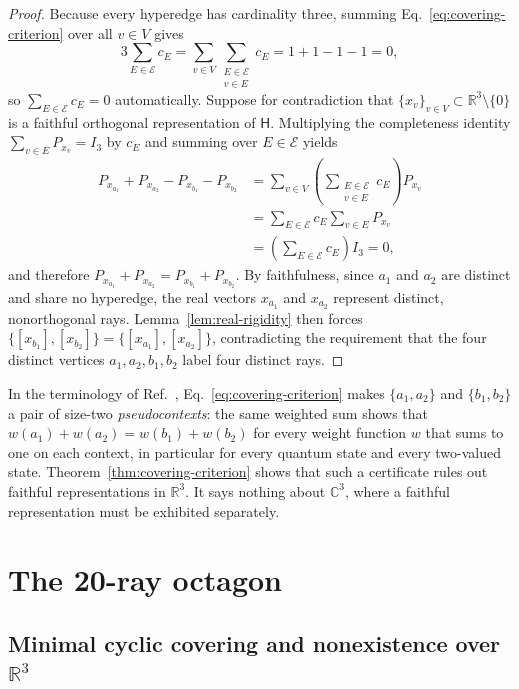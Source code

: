\documentclass[twocolumn,aps,pra,floatfix,amsmath,amssymb,longbibliography]{revtex4-2}
\newenvironment{handrewrite}{\leavevmode\color{blue}}{}
\theoremstyle{definition}
\theoremstyle{remark}
\newcommand{\C}{\mathbb C}
\newcommand{\R}{\mathbb R}
\begin{document}
\begin{proof}
Because every hyperedge has cardinality three, summing
Eq.~\eqref{eq:covering-criterion} over all $v\in V$ gives
\[
 3\sum_{E\in\mathcal E} c_E
 =\sum_{v\in V}\sum_{\substack{E\in\mathcal E\\ v\in E}} c_E
 =1+1-1-1=0,
\]
so $\sum_{E\in\mathcal E} c_E=0$ automatically.  Suppose for contradiction
that $\{x_v\}_{v\in V}\subset\R^3\setminus\{0\}$ is a faithful orthogonal
representation of $\mathsf H$.  Multiplying the completeness identity
$\sum_{v\in E} P_{x_v}=I_3$ by $c_E$ and summing over $E\in\mathcal E$ yields
\begin{align*}
 P_{x_{a_1}}+P_{x_{a_2}}-P_{x_{b_1}}-P_{x_{b_2}}
 &=\sum_{v\in V}\!\left(\sum_{\substack{E\in\mathcal E\\ v\in E}} c_E\right)P_{x_v}\\
 &=\sum_{E\in\mathcal E} c_E\sum_{v\in E} P_{x_v}\\
 &=\left(\sum_{E\in\mathcal E} c_E\right)I_3=0,
\end{align*}
and therefore $P_{x_{a_1}}+P_{x_{a_2}}=P_{x_{b_1}}+P_{x_{b_2}}$.
By faithfulness, since $a_1$ and $a_2$ are distinct and share no hyperedge,
the real vectors $x_{a_1}$ and $x_{a_2}$ represent distinct, nonorthogonal
rays.  Lemma~\ref{lem:real-rigidity} then forces
$\{[x_{b_1}],[x_{b_2}]\}=\{[x_{a_1}],[x_{a_2}]\}$, contradicting the
requirement that the four distinct vertices $a_1,a_2,b_1,b_2$ label four
distinct rays.
\end{proof}

\begin{handrewrite}
In the terminology of Ref.~\cite{2026-Navara-Svozil-pseudocontexts},
Eq.~\eqref{eq:covering-criterion} makes $\{a_1,a_2\}$ and $\{b_1,b_2\}$ a
pair of size-two \emph{pseudocontexts}: the same weighted sum shows that
$w(a_1)+w(a_2)=w(b_1)+w(b_2)$ for every weight function $w$ that sums to one
on each context, in particular for every quantum state and every two-valued
state.  Theorem~\ref{thm:covering-criterion} shows that such a certificate
rules out faithful representations in $\R^3$.  It says nothing about $\C^3$,
where a faithful representation must be exhibited separately.
\end{handrewrite}

\section{The 20-ray octagon}
\label{sec:h20}

\subsection{Minimal cyclic covering and nonexistence over
\texorpdfstring{$\R^3$}{R3}}
\end{document}

